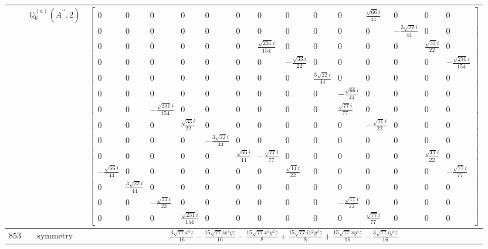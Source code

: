 \documentclass[fleqn,8pt,landscape]{jsarticle}
\begin{document}
\begin{longtable}{ccc}
$  $ & $ \mathbb{Q}_{6}^{(a)}(A^{\prime\prime},2) $ & $ \begin{bmatrix} 0 & 0 & 0 & 0 & 0 & 0 & 0 & 0 & 0 & 0 & \frac{\sqrt{66} i}{44} & 0 & 0 & 0 \\ 0 & 0 & 0 & 0 & 0 & 0 & 0 & 0 & 0 & 0 & 0 & - \frac{3 \sqrt{22} i}{44} & 0 & 0 \\ 0 & 0 & 0 & 0 & 0 & 0 & \frac{\sqrt{231} i}{154} & 0 & 0 & 0 & 0 & 0 & \frac{\sqrt{33} i}{22} & 0 \\ 0 & 0 & 0 & 0 & 0 & 0 & 0 & - \frac{\sqrt{33} i}{22} & 0 & 0 & 0 & 0 & 0 & - \frac{\sqrt{231} i}{154} \\ 0 & 0 & 0 & 0 & 0 & 0 & 0 & 0 & \frac{3 \sqrt{22} i}{44} & 0 & 0 & 0 & 0 & 0 \\ 0 & 0 & 0 & 0 & 0 & 0 & 0 & 0 & 0 & - \frac{\sqrt{66} i}{44} & 0 & 0 & 0 & 0 \\ 0 & 0 & - \frac{\sqrt{231} i}{154} & 0 & 0 & 0 & 0 & 0 & 0 & \frac{\sqrt{77} i}{77} & 0 & 0 & 0 & 0 \\ 0 & 0 & 0 & \frac{\sqrt{33} i}{22} & 0 & 0 & 0 & 0 & 0 & 0 & - \frac{\sqrt{11} i}{22} & 0 & 0 & 0 \\ 0 & 0 & 0 & 0 & - \frac{3 \sqrt{22} i}{44} & 0 & 0 & 0 & 0 & 0 & 0 & 0 & 0 & 0 \\ 0 & 0 & 0 & 0 & 0 & \frac{\sqrt{66} i}{44} & - \frac{\sqrt{77} i}{77} & 0 & 0 & 0 & 0 & 0 & \frac{\sqrt{11} i}{22} & 0 \\ - \frac{\sqrt{66} i}{44} & 0 & 0 & 0 & 0 & 0 & 0 & \frac{\sqrt{11} i}{22} & 0 & 0 & 0 & 0 & 0 & - \frac{\sqrt{77} i}{77} \\ 0 & \frac{3 \sqrt{22} i}{44} & 0 & 0 & 0 & 0 & 0 & 0 & 0 & 0 & 0 & 0 & 0 & 0 \\ 0 & 0 & - \frac{\sqrt{33} i}{22} & 0 & 0 & 0 & 0 & 0 & 0 & - \frac{\sqrt{11} i}{22} & 0 & 0 & 0 & 0 \\ 0 & 0 & 0 & \frac{\sqrt{231} i}{154} & 0 & 0 & 0 & 0 & 0 & 0 & \frac{\sqrt{77} i}{77} & 0 & 0 & 0 \end{bmatrix} $ \\ \hline
$ 853 $ & $ \text{symmetry} $ & $ \frac{3 \sqrt{77} x^{5} z}{16} - \frac{15 \sqrt{77} i x^{4} y z}{16} - \frac{15 \sqrt{77} x^{3} y^{2} z}{8} + \frac{15 \sqrt{77} i x^{2} y^{3} z}{8} + \frac{15 \sqrt{77} x y^{4} z}{16} - \frac{3 \sqrt{77} i y^{5} z}{16} $ \\

\end{longtable}
\end{document}
